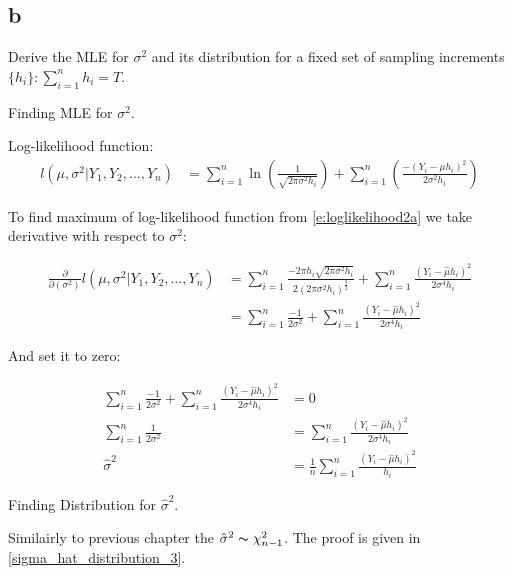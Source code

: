 \subsection{b}
\label{subsection_2_b}
Derive the MLE for $\sigma^2$ and its distribution for a fixed set of sampling increments $\{h_i\}:\sum_{i=1}^nh_i=T$.

\begin{solution} 
Finding MLE for $\sigma^2$.

Log-likelihood function:
\begin{equation}
\label{e:loglikelihood2b}
\begin{aligned}
\mathit{l}\left(\mu,\sigma^2|Y_1, Y_2, \ldots, Y_n\right) & = \sum_{i=1}^n\ln\left(\frac{1}{\sqrt{2\pi\sigma^2h_i}}\right) + \sum_{i=1}^n\left(\frac{-(Y_i-\mu h_i)^2}{2\sigma^2h_i}\right)
\end{aligned}
\end{equation}

To find maximum of log-likelihood function from \eqref{e:loglikelihood2a} we take derivative with respect to $\sigma^2$:

\begin{equation}
\begin{aligned}
\frac{\partial}{\partial(\sigma^2)}\mathit{l}\left(\mu,\sigma^2|Y_1, Y_2, \ldots, Y_n\right) 
								& = \sum_{i=1}^n\frac{-2\pi h_i\sqrt{2\pi\sigma^2h_i}}{2(2\pi\sigma^2h_i)^{\frac{3}{2}}}
										+ \sum_{i=1}^n\frac{(Y_i-\hat{\mu} h_i)^2}{2\sigma^4h_i} \\
								& = \sum_{i=1}^n\frac{-1}{2\sigma^2}
										+ \sum_{i=1}^n\frac{(Y_i-\hat{\mu} h_i)^2}{2\sigma^4h_i}
\end{aligned}
\end{equation}

And set it to zero: 

\begin{equation}
\begin{aligned}
\sum_{i=1}^n\frac{-1}{2\sigma^2} + \sum_{i=1}^n\frac{(Y_i-\hat{\mu} h_i)^2}{2\sigma^4h_i} & = 0 \\
																												  \sum_{i=1}^n\frac{1}{2\sigma^2} & = \sum_{i=1}^n\frac{(Y_i-\hat{\mu} h_i)^2}{2\sigma^4h_i} \\
																												                   \hat{\sigma}^2 & = \frac{1}{n}\sum_{i=1}^n\frac{(Y_i-\hat{\mu} h_i)^2}{h_i}
\end{aligned}
\end{equation}

\end{solution}

\begin{solution}
Finding Distribution for $\hat{\sigma}^2$.

Similairly to previous chapter the $\hat{\sigma}^2 \thicksim \chi_{n-1}^2$. The proof is given in \ref{sigma_hat_distribution_3}.


\end{solution}